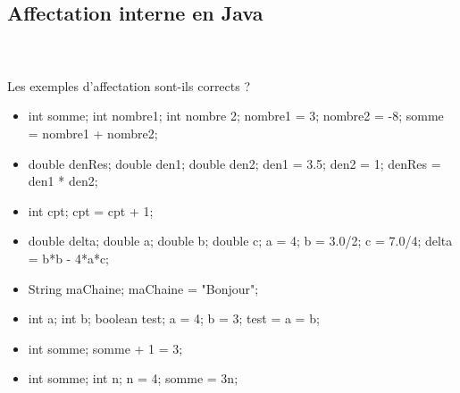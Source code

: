 \documentclass[11pt,a4paper]{article}
\begin{document}
        \subsection{Affectation interne en Java}
			
		\subparagraph{} 
		
                \textcolor{white}{.} \par
            Les exemples d'affectation sont-ils corrects ?
						
            \begin{itemize} 
        
            \item[ \ding{"6F} ] \begin{Java}
  
int somme;
int nombre1;
int nombre 2;
nombre1 = 3;
nombre2 = -8;
somme = nombre1 + nombre2;\end{Java}
        
            \item[ \ding{"6F} ] \begin{Java}

double denRes;
double den1;
double den2;
den1 = 3.5;
den2 = 1;
denRes = den1 * den2;\end{Java}
        
            \item[ \ding{"6F} ] \begin{Java}
						
int cpt; 
cpt = cpt + 1;\end{Java}
        
            \item[ \ding{"6F} ] \begin{Java}
						
double delta; 
double a; 
double b; 
double c; 
a = 4; 
b = 3.0/2; 
c = 7.0/4; 
delta = b*b - 4*a*c;\end{Java}
        
            \item[ \ding{"6F} ] \begin{Java}
						
String maChaine; 
maChaine = "Bonjour";\end{Java}
        
            \item[ \ding{"6F} ] \begin{Java}
						
int a; 
int b; 
boolean test;
a = 4;
b = 3;
test = a = b;\end{Java}
        
            \item[ \ding{"6F} ] \begin{Java}
						
int somme; 
somme + 1 = 3;\end{Java}
        
            \item[ \ding{"6F} ] \begin{Java}
						
int somme;
int n;
n = 4;
somme = 3n;\end{Java}
        
            \end{itemize} 
\end{document}
